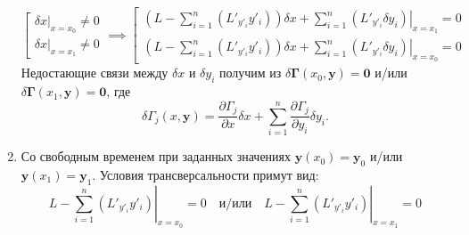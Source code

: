 \begin{enumerate}
	\begin{equation*}
		\left[
		\begin{array}{c}
			\left.\delta x\right|_{x=x_0}\neq0\\
			\left.\delta x\right|_{x=x_1}\neq0
		\end{array}
		\right. \implies
		\left[
		\begin{array}{c}
			\left. \left(L-\sum_{i=1}^{n}\left(L'_{y'_i}y'_i\right)\right)\delta x + \sum_{i=1}^{n}\left(L'_{y'_i}\delta y_i\right) \right|_{x=x_1}=0\\
			\left. \left(L-\sum_{i=1}^{n}\left(L'_{y'_i}y'_i\right)\right)\delta x + \sum_{i=1}^{n}\left(L'_{y'_i}\delta y_i\right) \right|_{x=x_0}=0
		\end{array}
		\right. 
	\end{equation*}
	Недостающие связи между $\delta x$ и $\delta y_i$ получим из $\delta \mathbf{\Gamma}(x_0,\mathbf{y})=\mathbf{0}$ и/или $\delta \mathbf{\Gamma}(x_1,\mathbf{y})=\mathbf{0}$, где
	\begin{equation*}
		\delta \Gamma_j(x,\mathbf{y})=\frac{\partial \Gamma_j}{\partial x}\delta x + \sum_{i=1}^{n}\frac{\partial \Gamma_j}{\partial y_i}\delta y_i.
	\end{equation*}
	\item Со свободным временем при заданных значениях $\mathbf{y}(x_0)=\mathbf{y}_0$ и/или $\mathbf{y}(x_1)=\mathbf{y}_1$.
	Условия трансверсальности примут вид:
	\begin{equation*}
		\left.L - \sum_{i=1}^{n}\left(L'_{y'_i}y'_i\right)\right|_{x=x_0}=0
		\quad\text{и/или}\quad
		\left.L - \sum_{i=1}^{n}\left(L'_{y'_i}y'_i\right)\right|_{x=x_1}=0
	\end{equation*}
\end{enumerate}

